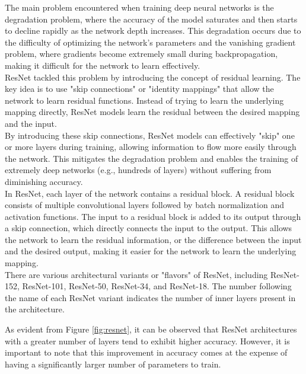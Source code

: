 The main problem encountered when training deep neural networks is the
degradation problem, where the accuracy of the model saturates and then starts
to decline rapidly as the network depth increases. This degradation occurs due
to the difficulty of optimizing the network's parameters and the vanishing
gradient problem, where gradients become extremely small during
backpropagation, making it difficult for the network to learn effectively.
\\

ResNet tackled this problem by introducing the concept of residual learning.
The key idea is to use "skip connections" or "identity mappings" that allow the
network to learn residual functions. Instead of trying to learn the underlying
mapping directly, ResNet models learn the residual between the desired mapping
and the input. \\

By introducing these skip connections, ResNet models can effectively "skip" one
or more layers during training, allowing information to flow more easily
through the network. This mitigates the degradation problem and enables the
training of extremely deep networks (e.g., hundreds of layers) without
suffering from diminishing accuracy. \\

In ResNet, each layer of the network contains a residual block. A residual
block consists of multiple convolutional layers followed by batch normalization
and activation functions. The input to a residual block is added to its output
through a skip connection, which directly connects the input to the output.
This allows the network to learn the residual information, or the difference
between the input and the desired output, making it easier for the network to
learn the underlying mapping.  \\

There are various architectural variants or "flavors" of ResNet, including
ResNet-152,  ResNet-101,  ResNet-50,  ResNet-34, and  ResNet-18. The
number following the name of each ResNet variant indicates the number of inner
layers present in the architecture.

\newpage

As evident from Figure \ref{fig:resnet}, it can be observed that
ResNet architectures with a greater number of layers tend to exhibit higher
accuracy. However, it is important to note that this improvement in accuracy
comes at the expense of having a significantly larger number of parameters to
train.



